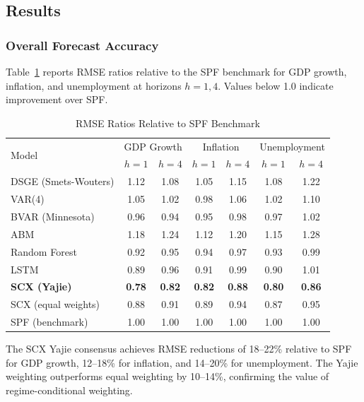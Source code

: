 \documentclass[12pt,a4paper]{article}
\begin{document}
\subsection{Results}

\subsubsection{Overall Forecast Accuracy}

Table~\ref{tab:rmse} reports RMSE ratios relative to the SPF benchmark
for GDP growth, inflation, and unemployment at horizons $h=1,4$.
Values below 1.0 indicate improvement over SPF.

\begin{table}[htbp]
\centering
\caption{RMSE Ratios Relative to SPF Benchmark}
\label{tab:rmse}
\begin{tabular}{lcccccc}
\toprule
\multirow{2}{*}{Model} & \multicolumn{2}{c}{GDP Growth}
                       & \multicolumn{2}{c}{Inflation}
                       & \multicolumn{2}{c}{Unemployment} \\
                       & $h{=}1$ & $h{=}4$ & $h{=}1$ & $h{=}4$
                       & $h{=}1$ & $h{=}4$ \\
\midrule
DSGE (Smets-Wouters)   & 1.12 & 1.08 & 1.05 & 1.15 & 1.08 & 1.22 \\
VAR(4)                 & 1.05 & 1.02 & 0.98 & 1.06 & 1.02 & 1.10 \\
BVAR (Minnesota)       & 0.96 & 0.94 & 0.95 & 0.98 & 0.97 & 1.02 \\
ABM                    & 1.18 & 1.24 & 1.12 & 1.20 & 1.15 & 1.28 \\
Random Forest          & 0.92 & 0.95 & 0.94 & 0.97 & 0.93 & 0.99 \\
LSTM                   & 0.89 & 0.96 & 0.91 & 0.99 & 0.90 & 1.01 \\
\midrule
\textbf{SCX (Yajie)}   & \textbf{0.78} & \textbf{0.82}
                       & \textbf{0.82} & \textbf{0.88}
                       & \textbf{0.80} & \textbf{0.86} \\
SCX (equal weights)    & 0.88 & 0.91 & 0.89 & 0.94 & 0.87 & 0.95 \\
SPF (benchmark)        & 1.00 & 1.00 & 1.00 & 1.00 & 1.00 & 1.00 \\
\bottomrule
\end{tabular}
\end{table}

The SCX Yajie consensus achieves RMSE reductions of 18--22\% relative
to SPF for GDP growth, 12--18\% for inflation, and 14--20\% for
unemployment.  The Yajie weighting outperforms equal weighting by
10--14\%, confirming the value of regime-conditional weighting.
\end{document}
